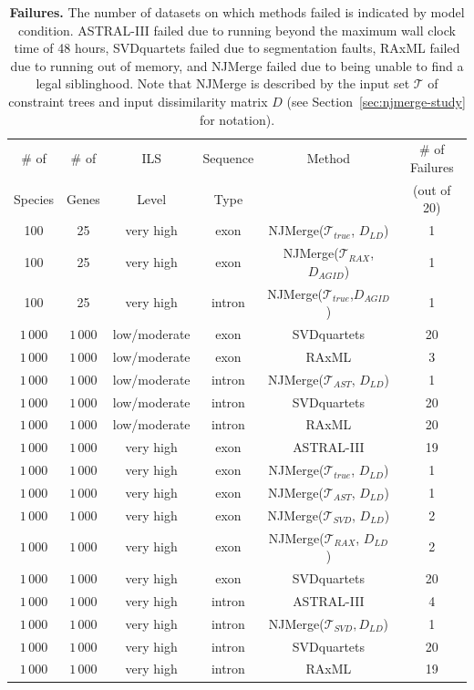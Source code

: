 \begin{table}[!h]
\caption{{\bf Failures. } The number of datasets on which methods failed is indicated by model condition.
ASTRAL-III failed due to running beyond the maximum wall clock time of 48 hours, SVDquartets failed due to segmentation faults, RAxML failed due to running out of memory, and NJMerge failed due to being unable to find a legal siblinghood. 
Note that NJMerge is described by the input set $\mathcal{T}$ of constraint trees  and input dissimilarity matrix $D$ (see Section~\ref{sec:njmerge-study} for notation).
}\label{tab:fail}
\centering
\begin{tabular}{cccccc}
\toprule
\# of & \# of & ILS & Sequence & Method & \# of Failures \\
Species & Genes & Level & Type & & (out of 20)  \\
\midrule
100 & 25 & very high & exon & NJMerge($\mathcal{T}_{true}$, $D_{LD}$) & 1\\
100 & 25 & very high & exon & NJMerge($\mathcal{T}_{RAX}$, $D_{AGID}$) & 1\\
100 & 25 & very high & intron & NJMerge($\mathcal{T}_{true}$,$ D_{AGID}$) & 1\\
$1\,000$ & $1\,000$ & low/moderate & exon & SVDquartets & 20\\
$1\,000$ & $1\,000$ & low/moderate & exon & RAxML & 3\\
$1\,000$ & $1\,000$ & low/moderate & intron & NJMerge($\mathcal{T}_{AST}$, $D_{LD}$) & 1\\
$1\,000$ & $1\,000$ & low/moderate & intron & SVDquartets & 20\\
$1\,000$ & $1\,000$ & low/moderate & intron & RAxML & 20\\
$1\,000$ & $1\,000$ & very high & exon & ASTRAL-III & 19\\
$1\,000$ & $1\,000$ & very high & exon & NJMerge($\mathcal{T}_{true}$, $D_{LD}$) & 1\\
$1\,000$ & $1\,000$ & very high & exon & NJMerge($\mathcal{T}_{AST}$, $D_{LD}$) & 1\\
$1\,000$ & $1\,000$ & very high & exon & NJMerge($\mathcal{T}_{SVD}$, $D_{LD}$) & 2\\
$1\,000$ & $1\,000$ & very high & exon & NJMerge($\mathcal{T}_{RAX}$, $D_{LD}$) & 2\\
$1\,000$ & $1\,000$ & very high & exon & SVDquartets & 20\\
$1\,000$ & $1\,000$ & very high & intron & ASTRAL-III & 4\\
$1\,000$ & $1\,000$ & very high & intron & NJMerge($\mathcal{T}_{SVD}, D_{LD}$) & 1\\
$1\,000$ & $1\,000$ & very high & intron & SVDquartets & 20\\
$1\,000$ & $1\,000$ & very high & intron & RAxML & 19\\
\bottomrule
\end{tabular}
\end{table}

